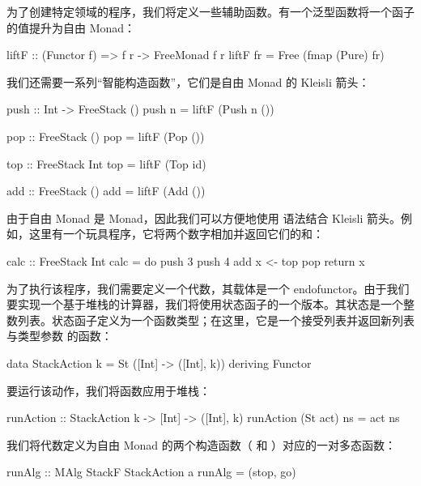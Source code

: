 \documentclass[DaoFP]{subfiles}
\begin{document}
    为了创建特定领域的程序，我们将定义一些辅助函数。有一个泛型函数将一个函子的值提升为自由 Monad：

    \begin{haskell}
        liftF :: (Functor f) => f r -> FreeMonad f r
        liftF fr = Free (fmap (Pure) fr)
    \end{haskell}

    我们还需要一系列“智能构造函数”，它们是自由 Monad 的 Kleisli 箭头：

    \begin{haskell}
        push :: Int -> FreeStack ()
        push n = liftF (Push n ())

        pop :: FreeStack ()
        pop = liftF (Pop ())

        top :: FreeStack Int
        top = liftF (Top id)

        add :: FreeStack ()
        add = liftF (Add ())
    \end{haskell}

    由于自由 Monad 是 Monad，因此我们可以方便地使用  语法结合 Kleisli 箭头。例如，这里有一个玩具程序，它将两个数字相加并返回它们的和：

    \begin{haskell}
        calc :: FreeStack Int
        calc = do
        push 3
        push 4
        add
        x <- top
        pop
        return x
    \end{haskell}

    为了执行该程序，我们需要定义一个代数，其载体是一个 endofunctor。由于我们要实现一个基于堆栈的计算器，我们将使用状态函子的一个版本。其状态是一个整数列表。状态函子定义为一个函数类型；在这里，它是一个接受列表并返回新列表与类型参数  的函数：

    \begin{haskell}
        data StackAction k = St ([Int] -> ([Int], k))
        deriving Functor
    \end{haskell}

    要运行该动作，我们将函数应用于堆栈：

    \begin{haskell}
        runAction :: StackAction k -> [Int] -> ([Int], k)
        runAction (St act) ns = act ns
    \end{haskell}

    我们将代数定义为自由 Monad 的两个构造函数（ 和 ）对应的一对多态函数：

    \begin{haskell}
        runAlg :: MAlg StackF StackAction a
        runAlg = (stop, go)
    \end{haskell}
\end{document}

